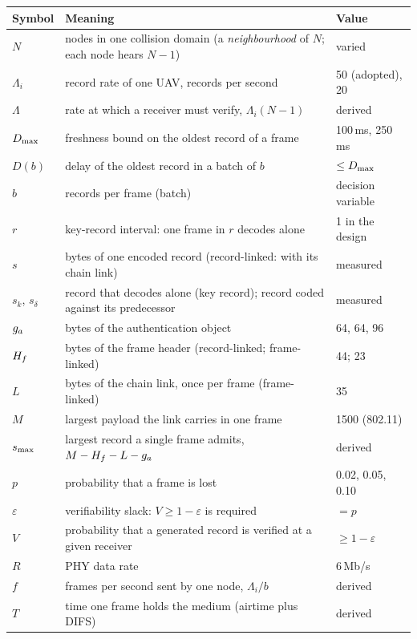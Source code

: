 {\small
\noindent\begin{tabularx}{\textwidth}{@{}l Y l@{}}
\toprule
Symbol & Meaning & Value \\
\midrule
$N$        & nodes in one collision domain (a \emph{neighbourhood} of $N$; each node hears $N-1$) & varied \\
$\Lambda_i$ & record rate of one UAV, records per second & 50 (adopted), 20 \\
$\Lambda$   & rate at which a receiver must verify, $\Lambda_i (N-1)$ & derived \\
$D_{\max}$    & freshness bound on the oldest record of a frame & 100\,ms, 250\,ms \\
$D(b)$     & delay of the oldest record in a batch of $b$ & $\leq D_{\max}$ \\
$b$        & records per frame (batch) & decision variable \\
$r$        & key-record interval: one frame in $r$ decodes alone & 1 in the design \\
$s$        & bytes of one encoded record (record-linked: with its chain link) & measured \\
$s_k$, $s_\delta$ & record that decodes alone (key record); record coded against its predecessor & measured \\
$g_a$      & bytes of the authentication object & 64, 64, 96 \\
$H_f$      & bytes of the frame header (record-linked; frame-linked) & 44; 23 \\
$L$        & bytes of the chain link, once per frame (frame-linked) & 35 \\
$M$        & largest payload the link carries in one frame & 1500 (802.11) \\
$s_{\max}$    & largest record a single frame admits, $M - H_f - L - g_a$ & derived \\
$p$        & probability that a frame is lost & 0.02, 0.05, 0.10 \\
$\varepsilon$ & verifiability slack: $V \geq 1-\varepsilon$ is required & $= p$ \\
$V$        & probability that a generated record is verified at a given receiver & $\geq 1-\varepsilon$ \\
$R$        & PHY data rate & 6\,Mb/s \\
$f$        & frames per second sent by one node, $\Lambda_i/b$ & derived \\
$T$        & time one frame holds the medium (airtime plus DIFS) & derived \\

\end{tabularx}}
